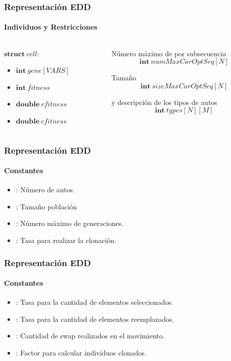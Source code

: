 \frame
{
\frametitle{Representación EDD}
\framesubtitle{Individuos y Restricciones}
\begin{columns}
	\begin{column}{0.3\textwidth}
    $\textbf{struct}\ cell$:

        \begin{itemize}
            \item $\textbf{int}\ gene[VARS]$
            \item $\textbf{int}\ fitness$
            \item $\textbf{double}\ rfitness$
            \item $\textbf{double}\ cfitness$
        \end{itemize}
	\end{column}
	\begin{column}{0.7\textwidth}
		Número máximo de  por subsecuencia
		$$\textbf{int}\ numMaxCarOptSeq[N]$$
	
		Tamaño 
		$$\textbf{int}\ sizeMaxCarOptSeq[N]$$
	
		 y descripción de los tipos de autos
		$$\textbf{int}\ types[N][M]$$
	\end{column}
\end{columns}
}

\frame
{
\frametitle{Representación EDD}
\framesubtitle{Constantes}
        \begin{itemize}
            \item {}: Número de autos.
            \item {}: Tamaño población
            \item {}: Número máximo de generaciones.
            \item {}: Tasa para realizar la clonación.
		\end{itemize}
}

\frame
{
\frametitle{Representación EDD}
\framesubtitle{Constantes}
        \begin{itemize}
            \item {}: Tasa para la cantidad de elementos seleccionados.
            \item {}: Tasa para la cantidad de elementos reemplazados.
            \item {}: Cantidad de swap realizados en el movimiento.
            \item {}: Factor para calcular individuos clonados.
        \end{itemize}
}
